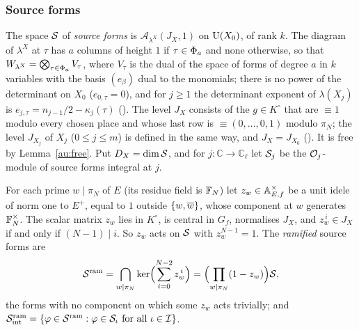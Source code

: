 \documentclass[10pt]{amsart}
\theoremstyle{definition}
\theoremstyle{remark}
\newcommand{\C}{\mathbb C}
\begin{document}
\subsubsection*{Source forms}
The space $\mathcal S$ of \emph{source forms} is $\mathcal A_{\lambda^X}(J_X,1)$ on $\mathrm U(X_0)$, of rank
$k$. The diagram of $\lambda^X$ at $\tau$ has $a$ columns of height $1$ if $\tau\in\Phi_a$ and none
otherwise, so that $W_{\lambda^X}=\bigotimes_{\tau\in\Phi_a}V_\tau$, where $V_\tau$ is the dual of the space of
forms of degree $a$ in $k$ variables with the basis $(e_\beta)$ dual to the monomials; there is no
power of the determinant on $X_0$ ($e_{0,\tau}=0$), and for $j\ge1$ the determinant exponent of
$\lambda(X_j)$ is $e_{j,\tau}=n_{j-1}/2-\kappa_j(\tau)$ ({\cite[\S5.1.1]{P49}}). The level $J_X$ consists of the $g\in K^\circ$ that are $\equiv1$ modulo every chosen
place and whose last row is $\equiv(0,\dots,0,1)$ modulo $\pi_N$; the level $J_{X_j}$ of $X_j$
($0\le j\le m$) is defined in the same way, and $J_X=J_{X_0}$ ({\cite[\S8.3]{P49}}). It is free by
Lemma~\ref{au:free}. Put $D_X=\dim\mathcal S$, and for $j\colon\C\to\C_\ell$ let $\mathcal S_j$ be the
$\mathcal O_j$-module of source forms integral at $j$.

For each prime $w\mid\pi_N$ of $E$ (its residue field is $\mathbb F_N$) let $z_w\in\mathbb A_{E,f}^\times$
be a unit idele of norm one to $E^+$, equal to $1$ outside $\{w,\overline{w}\}$, whose component at
$w$ generates $\mathbb F_N^\times$. The scalar matrix $z_w$ lies in $K^\circ$, is central in $G_f$,
normalises $J_X$, and $z_w^{\,i}\in J_X$ if and only if $(N-1)\mid i$. So $z_w$ acts on $\mathcal S$
with $z_w^{N-1}=1$. The \emph{ramified} source forms are
\[
\mathcal S^{\mathrm{ram}}=\bigcap_{w\mid\pi_N}\ker\Bigl(\sum_{i=0}^{N-2}z_w^{\,i}\Bigr)=
\Bigl(\prod_{w\mid\pi_N}(1-z_w)\Bigr)\mathcal S ,
\]
the forms with no component on which some $z_w$ acts trivially; and
$\mathcal S^{\mathrm{ram}}_{\mathrm{int}}=\{\varphi\in\mathcal S^{\mathrm{ram}}:\varphi\in\mathcal S_\iota\text{ for all }\iota\in\mathcal I\}$.
\end{document}
